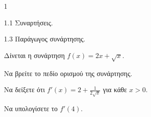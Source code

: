 \begin{ylh}{1}
    \item 1.1 Συναρτήσεις.
    \item 1.3 Παράγωγος συνάρτησης.
\end{ylh}
Δίνεται η συνάρτηση $f(x) = 2x + \sqrt{x}$.
\begin{alist}
    \item Να βρείτε το πεδίο ορισμού της συνάρτησης. 
    \item Να δείξετε ότι $f'(x) = 2 + \frac{1}{2\sqrt{x}}$ για κάθε $x > 0$. 
    \item Να υπολογίσετε το $f'(4)$. 
\end{alist}

